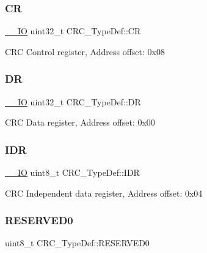 \subsubsection{\texorpdfstring{CR}{CR}}
{\footnotesize\ttfamily \hyperlink{core__sc300_8h_aec43007d9998a0a0e01faede4133d6be}{\+\_\+\+\_\+\+IO} uint32\+\_\+t C\+R\+C\+\_\+\+Type\+Def\+::\+CR}

C\+RC Control register, Address offset\+: 0x08 \mbox{\label{struct_c_r_c___type_def_a50cb22870dbb9001241cec694994e5ef}} 
\subsubsection{\texorpdfstring{DR}{DR}}
{\footnotesize\ttfamily \hyperlink{core__sc300_8h_aec43007d9998a0a0e01faede4133d6be}{\+\_\+\+\_\+\+IO} uint32\+\_\+t C\+R\+C\+\_\+\+Type\+Def\+::\+DR}

C\+RC Data register, Address offset\+: 0x00 \mbox{\label{struct_c_r_c___type_def_ad84e8694cd4b5375ee533c2d875c3b5a}} 
\subsubsection{\texorpdfstring{I\+DR}{IDR}}
{\footnotesize\ttfamily \hyperlink{core__sc300_8h_aec43007d9998a0a0e01faede4133d6be}{\+\_\+\+\_\+\+IO} uint8\+\_\+t C\+R\+C\+\_\+\+Type\+Def\+::\+I\+DR}

C\+RC Independent data register, Address offset\+: 0x04 \mbox{\label{struct_c_r_c___type_def_a70dfd1730dba65041550ef55a44db87c}} 
\subsubsection{\texorpdfstring{R\+E\+S\+E\+R\+V\+E\+D0}{RESERVED0}}
{\footnotesize\ttfamily uint8\+\_\+t C\+R\+C\+\_\+\+Type\+Def\+::\+R\+E\+S\+E\+R\+V\+E\+D0}

